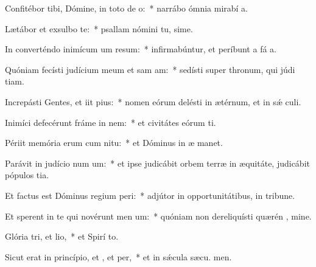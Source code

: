 \item Confitébor tibi, Dómine, in toto de o:~* narrábo ómnia mirabí a.
\item Lætábor et exsulbo  te:~* psallam nómini tu, sime.
\item In converténdo inimícum um resum:~* infirmabúntur, et períbunt a fá a.
\item Quóniam fecísti judícium meum et sam am:~* sedísti super thronum, qui júdi tiam.
\item Increpásti Gentes, et iit pius:~* nomen eórum delésti in ætérnum, et in sǽ culi.
\item Inimíci defecérunt fráme in nem:~* et civitátes eórum ti.
\item Périit memória erum cum nitu:~* et Dóminus in æ manet.
\item Parávit in judício num um:~* et ipse judicábit orbem terræ in æquitáte, judicábit pópulos  tia.
\item Et factus est Dóminus regium peri:~* adjútor in opportunitátibus, in tribune.
\item Et sperent in te qui novérunt men um:~* quóniam non dereliquísti quærén , mine.
\item Glória tri, et lio,~* et Spirí to.
\item Sicut erat in princípio, et , et per,~* et in sǽcula sæcu. men.
